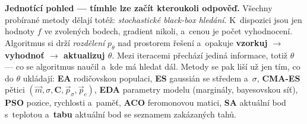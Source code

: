 \documentclass[10pt,a4paper]{article}
\newcommand{\ra}{$\rightarrow$}
\begin{document}
\begin{qbox}{}
\footnotesize\raggedright
\textbf{Jednotící pohled --- tímhle lze začít kteroukoli odpověď.}
Všechny probírané metody dělají totéž: \emph{stochastické black-box hledání}. K~dispozici jsou
jen hodnoty $f$ ve zvolených bodech, gradient nikoli, a~cenou je počet vyhodnocení.
Algoritmus si drží \emph{rozdělení} $p_\theta$ nad prostorem řešení a~opakuje
\textbf{vzorkuj \ra{} vyhodnoť \ra{} aktualizuj $\theta$}. Mezi iteracemi přechází jediná
informace, totiž $\theta$ --- co se algoritmus naučil a~kde má hledat dál. Metody se pak liší
už jen tím, co do $\theta$ ukládají: \textbf{EA} rodičovskou populaci, \textbf{ES} gaussián se
středem a~$\sigma$, \textbf{CMA-ES} pětici $(\vec m,\sigma,\mathbf C,\vec p_\sigma,\vec p_c)$,
\textbf{EDA} parametry modelu (marginály, bayesovskou síť), \textbf{PSO} pozice, rychlosti
a~paměť, \textbf{ACO} feromonovou matici, \textbf{SA} aktuální bod s~teplotou a~\textbf{tabu}
aktuální bod se seznamem zakázaných tahů.
\end{qbox}
\end{document}

